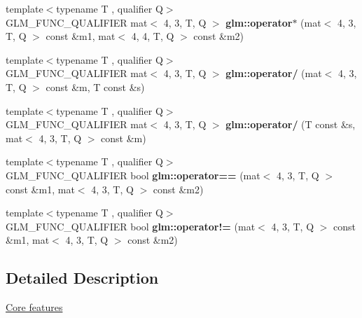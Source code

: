 \begin{DoxyCompactItemize}
\item 
\mbox{\label{type__mat4x3_8inl_a20cee434e0e8aa636d90ead7d68ad21c}} 
{\footnotesize template$<$typename T , qualifier Q$>$ }\\G\+L\+M\+\_\+\+F\+U\+N\+C\+\_\+\+Q\+U\+A\+L\+I\+F\+I\+ER mat$<$ 4, 3, T, Q $>$ {\bfseries glm\+::operator$\ast$} (mat$<$ 4, 3, T, Q $>$ const \&m1, mat$<$ 4, 4, T, Q $>$ const \&m2)
\item 
\mbox{\label{type__mat4x3_8inl_a5b9c4afb6fad0587676d07d72dd4de12}} 
{\footnotesize template$<$typename T , qualifier Q$>$ }\\G\+L\+M\+\_\+\+F\+U\+N\+C\+\_\+\+Q\+U\+A\+L\+I\+F\+I\+ER mat$<$ 4, 3, T, Q $>$ {\bfseries glm\+::operator/} (mat$<$ 4, 3, T, Q $>$ const \&m, T const \&s)
\item 
\mbox{\label{type__mat4x3_8inl_a9297fc703a71f65560bebe2973395909}} 
{\footnotesize template$<$typename T , qualifier Q$>$ }\\G\+L\+M\+\_\+\+F\+U\+N\+C\+\_\+\+Q\+U\+A\+L\+I\+F\+I\+ER mat$<$ 4, 3, T, Q $>$ {\bfseries glm\+::operator/} (T const \&s, mat$<$ 4, 3, T, Q $>$ const \&m)
\item 
\mbox{\label{type__mat4x3_8inl_a0ecc71747b2eacf683dd247ea01a4e2f}} 
{\footnotesize template$<$typename T , qualifier Q$>$ }\\G\+L\+M\+\_\+\+F\+U\+N\+C\+\_\+\+Q\+U\+A\+L\+I\+F\+I\+ER bool {\bfseries glm\+::operator==} (mat$<$ 4, 3, T, Q $>$ const \&m1, mat$<$ 4, 3, T, Q $>$ const \&m2)
\item 
\mbox{\label{type__mat4x3_8inl_a0e429d0fd01d857c38735f9191e0607e}} 
{\footnotesize template$<$typename T , qualifier Q$>$ }\\G\+L\+M\+\_\+\+F\+U\+N\+C\+\_\+\+Q\+U\+A\+L\+I\+F\+I\+ER bool {\bfseries glm\+::operator!=} (mat$<$ 4, 3, T, Q $>$ const \&m1, mat$<$ 4, 3, T, Q $>$ const \&m2)
\end{DoxyCompactItemize}


\subsection{Detailed Description}
\hyperlink{group__core}{Core features} 